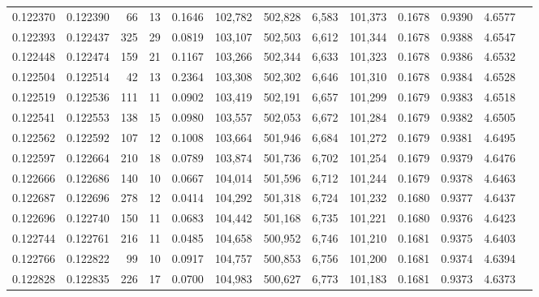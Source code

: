 \begin{tabular}{rrrrrrrrrrrrr}
0.122370 & 0.122390 &    66 &  13 &                                     0.1646 & 102,782 & 502,828 &   6,583 & 101,373 & 0.1678 & 0.9390 & 4.6577 \\
0.122393 & 0.122437 &   325 &  29 &                                     0.0819 & 103,107 & 502,503 &   6,612 & 101,344 & 0.1678 & 0.9388 & 4.6547 \\
0.122448 & 0.122474 &   159 &  21 &                                     0.1167 & 103,266 & 502,344 &   6,633 & 101,323 & 0.1678 & 0.9386 & 4.6532 \\
0.122504 & 0.122514 &    42 &  13 &                                     0.2364 & 103,308 & 502,302 &   6,646 & 101,310 & 0.1678 & 0.9384 & 4.6528 \\
0.122519 & 0.122536 &   111 &  11 &                                     0.0902 & 103,419 & 502,191 &   6,657 & 101,299 & 0.1679 & 0.9383 & 4.6518 \\
0.122541 & 0.122553 &   138 &  15 &                                     0.0980 & 103,557 & 502,053 &   6,672 & 101,284 & 0.1679 & 0.9382 & 4.6505 \\
0.122562 & 0.122592 &   107 &  12 &                                     0.1008 & 103,664 & 501,946 &   6,684 & 101,272 & 0.1679 & 0.9381 & 4.6495 \\
0.122597 & 0.122664 &   210 &  18 &                                     0.0789 & 103,874 & 501,736 &   6,702 & 101,254 & 0.1679 & 0.9379 & 4.6476 \\
0.122666 & 0.122686 &   140 &  10 &                                     0.0667 & 104,014 & 501,596 &   6,712 & 101,244 & 0.1679 & 0.9378 & 4.6463 \\
0.122687 & 0.122696 &   278 &  12 &                                     0.0414 & 104,292 & 501,318 &   6,724 & 101,232 & 0.1680 & 0.9377 & 4.6437 \\
0.122696 & 0.122740 &   150 &  11 &                                     0.0683 & 104,442 & 501,168 &   6,735 & 101,221 & 0.1680 & 0.9376 & 4.6423 \\
0.122744 & 0.122761 &   216 &  11 &                                     0.0485 & 104,658 & 500,952 &   6,746 & 101,210 & 0.1681 & 0.9375 & 4.6403 \\
0.122766 & 0.122822 &    99 &  10 &                                     0.0917 & 104,757 & 500,853 &   6,756 & 101,200 & 0.1681 & 0.9374 & 4.6394 \\
0.122828 & 0.122835 &   226 &  17 &                                     0.0700 & 104,983 & 500,627 &   6,773 & 101,183 & 0.1681 & 0.9373 & 4.6373 \\

\end{tabular}
